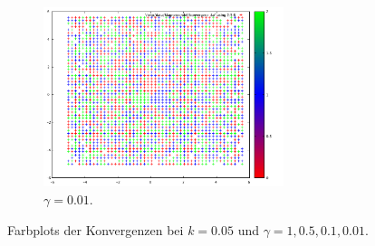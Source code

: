 \documentclass[
    oneside,
    ngerman,
    footinclude=false,
    captions=tableheading,
    DIV=12
]{scrartcl}
\begin{document}
\begin{figure}[H]
\begin{subfigure}[b]{0.49\textwidth}
            \includegraphics[width=7cm]{../Simulation/img/Farbbild-g001.png}
            \caption{$\gamma = 0.01$.}
        \end{subfigure}
        \caption{Farbplots der Konvergenzen bei $k = 0.05$ und $\gamma = 1,0.5,0.1,0.01$.}
    \end{figure}
\end{document}
